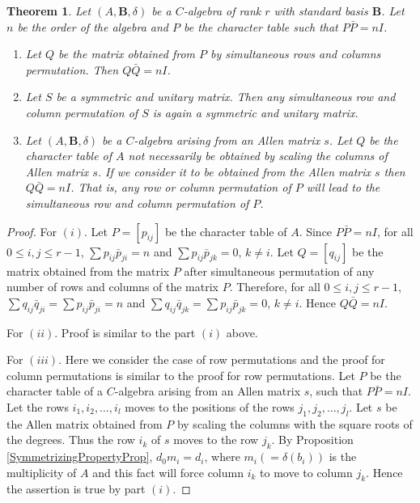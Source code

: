 \documentclass[12pt]{amsart}
\newtheorem{thm}{Theorem}
\begin{document}
\begin{thm}\label{SimulataneousPermThm} Let $(A,{{\mathbf B}}, \delta)$ be a $C$-algebra of rank $r$ with standard basis ${{\mathbf B}}$. Let $n$ be the order of the algebra and $P$ be the character table  such that $P\bar P=nI$.
\begin{enumerate}
  \item Let $Q$ be the matrix obtained from $P$ by simultaneous rows and columns permutation. Then $Q\bar Q=nI$.
\item Let $S$ be a symmetric and unitary matrix. Then any simultaneous row and column permutation of $S$ is again a symmetric and unitary matrix.
  \item Let $(A,{{\mathbf B}}, \delta)$ be a $C$-algebra arising from an Allen matrix $s$. Let $Q$ be the character table of $A$ not necessarily be obtained by scaling the columns of Allen matrix $s$. If we consider it to be obtained from the Allen matrix $s$ then $Q\bar Q=nI$. That is, any row or column permutation of $P$ will lead to the simultaneous row and column permutation of $P$.
       
\end{enumerate}
\end{thm}

\begin{proof}
For $(i)$. Let $P=[p_{ij}]$ be the character table of $A$. Since $P\bar P=nI$, for all $0\leq i, j\leq r-1$, $\sum p_{ij}\bar p_{ji}=n$ and $\sum p_{ij}\bar p_{jk}=0$, $k\neq i$. Let $Q=[q_{ij}]$ be the matrix obtained from the matrix $P$ after simultaneous permutation of any number of rows and columns of the matrix $P$.
Therefore, for all $0\leq i, j\leq r-1$, $\sum q_{ij}\bar q_{ji}=\sum p_{ij}\bar p_{ji}=n$ and $\sum q_{ij}\bar q_{jk}=\sum p_{ij}\bar p_{jk}=0$, $k\neq i$. Hence  $Q\bar Q=nI$.

\smallskip

For $(ii)$. Proof is similar to the part $(i)$ above.

\smallskip

For $(iii)$. Here we consider the case of row permutations and the proof for column permutations is similar to the proof for row permutations. Let $P$ be the character table of a $C$-algebra arising from an Allen matrix $s$,  such that $P\bar P=nI$. Let the rows $i_1,i_2, \hdots, i_l$ moves to the positions of the rows $j_1,j_2, \hdots, j_l$. Let $s$ be the Allen matrix obtained from $P$ by scaling the columns with the square roots of the degrees. Thus the row $i_k$ of $s$ moves to the row $j_k$. By Proposition \ref{SymmetrizingPropertyProp}, $d_0m_i=d_i$, where $m_i (=\delta(b_i))$ is the multiplicity of $A$ and this fact will force column $i_k$ to move to column $j_k$. Hence the assertion is true by part $(i)$.
\end{proof}
\end{document}
